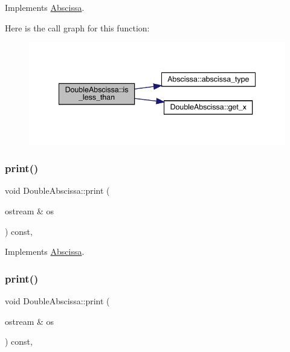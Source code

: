 Implements \mbox{\hyperlink{classAbscissa_a399c2f7a1309368b477c767ff5f63927}{Abscissa}}.

Here is the call graph for this function\+:
\nopagebreak
\begin{figure}[H]
\begin{center}
\leavevmode
\includegraphics[width=341pt]{d4/ded/classDoubleAbscissa_acf3a2bfc6b2c43a7a84310943b81849d_cgraph}
\end{center}
\end{figure}
\mbox{\label{classDoubleAbscissa_a164c2a9d56e6c9454069c70d6593a39b}} 
\subsubsection{\texorpdfstring{print()}{print()}\hspace{0.1cm}{\footnotesize\ttfamily [1/2]}}
{\footnotesize\ttfamily void Double\+Abscissa\+::print (\begin{DoxyParamCaption}\item[{ostream \&}]{os }\end{DoxyParamCaption}) const\hspace{0.3cm}{\ttfamily [inline]}, {\ttfamily [virtual]}}



Implements \mbox{\hyperlink{classAbscissa_a98e122d32d82979bd30338abc15768fd}{Abscissa}}.

\mbox{\label{classDoubleAbscissa_a164c2a9d56e6c9454069c70d6593a39b}} 
\subsubsection{\texorpdfstring{print()}{print()}\hspace{0.1cm}{\footnotesize\ttfamily [2/2]}}
{\footnotesize\ttfamily void Double\+Abscissa\+::print (\begin{DoxyParamCaption}\item[{ostream \&}]{os }\end{DoxyParamCaption}) const\hspace{0.3cm}{\ttfamily [inline]}, {\ttfamily [virtual]}}



